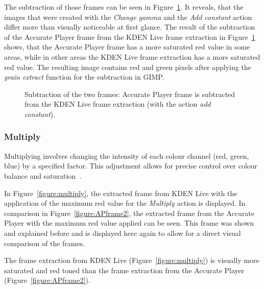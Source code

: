 \documentclass[../MasterThesis.tex]{subfiles}
\begin{document}
The subtraction of those frames can be seen in Figure~\ref{figure:addconstantgimp}. It reveals, that the images that were created with the \textit{Change gamma} and the \textit{Add constant} action differ more than visually noticeable at first glance. The result of the subtraction of the Accurate Player frame from the KDEN Live frame extraction in Figure~\ref{figure:addconstantgimp} shows, that the Accurate Player frame has a more saturated red value in some areas, while in other areas the KDEN Live frame extraction has a more saturated red value. The resulting image contains red and green pixels after applying the \textit{grain extract} function for the subtraction in GIMP.


\begin{figure}[H]
	\begin{center}
		\caption[Subtraction of KDEN Live (\textit{add constant}) and Accurate Player.]{Subtraction of the two frames: Accurate Player frame is subtracted from the KDEN Live frame extraction (with the action \textit{add constant}).}
		\label{figure:addconstantgimp}
	\end{center}
\end{figure}







\subsubsection*{Multiply}

Multiplying involves changing the intensity of each colour channel (red, green, blue) by a specified factor. This adjustment allows for precise control over colour balance and saturation~\cite{gimp}.

In Figure~\ref{figure:multiply}, the extracted frame from KDEN Live with the application of the maximum red value for the \textit{Multiply} action is displayed. 
In comparison in Figure~\ref{figure:APframe2}, the extracted frame from the Accurate Player with the maximum red value applied can be seen. This frame was shown and explained before and is displayed here again to allow for a direct visual comparison of the frames.

The frame extraction from KDEN Live (Figure~\ref{figure:multiply}) is visually more saturated and red toned than the frame extraction from the Accurate Player (Figure~\ref{figure:APframe2}).
\end{document}
